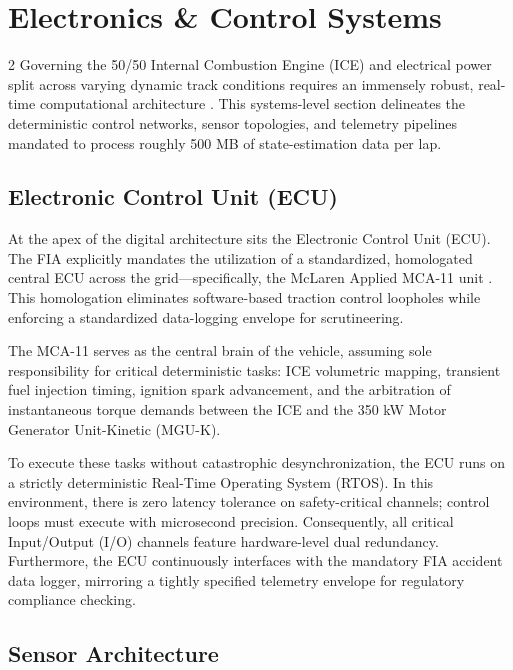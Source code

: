 \section{Electronics \& Control Systems}

\begin{multicols}{2}
Governing the 50/50 Internal Combustion Engine (ICE) and electrical power split across varying dynamic track conditions requires an immensely robust, real-time computational architecture \cite{FIA_2026_Technical_Regulations}. This systems-level section delineates the deterministic control networks, sensor topologies, and telemetry pipelines mandated to process roughly 500 MB of state-estimation data per lap.

\subsection{Electronic Control Unit (ECU)}

At the apex of the digital architecture sits the Electronic Control Unit (ECU). The FIA explicitly mandates the utilization of a standardized, homologated central ECU across the grid—specifically, the McLaren Applied MCA-11 unit \cite{mclaren_ecu_lit}. This homologation eliminates software-based traction control loopholes while enforcing a standardized data-logging envelope for scrutineering.

The MCA-11 serves as the central brain of the vehicle, assuming sole responsibility for critical deterministic tasks: ICE volumetric mapping, transient fuel injection timing, ignition spark advancement, and the arbitration of instantaneous torque demands between the ICE and the 350 kW Motor Generator Unit-Kinetic (MGU-K). 

To execute these tasks without catastrophic desynchronization, the ECU runs on a strictly deterministic Real-Time Operating System (RTOS). In this environment, there is zero latency tolerance on safety-critical channels; control loops must execute with microsecond precision. Consequently, all critical Input/Output (I/O) channels feature hardware-level dual redundancy. Furthermore, the ECU continuously interfaces with the mandatory FIA accident data logger, mirroring a tightly specified telemetry envelope for regulatory compliance checking.

\subsection{Sensor Architecture}


\end{multicols}

